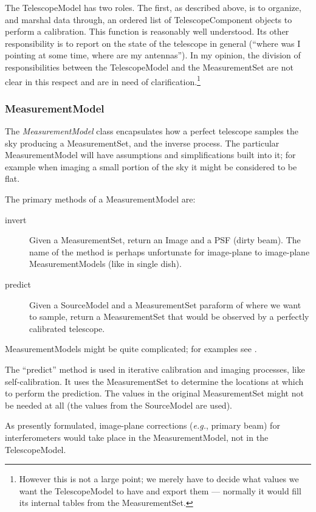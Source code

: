 The TelescopeModel has two roles. The first, as described above, is to
organize, and marshal data through, an ordered list of
TelescopeComponent objects to perform a calibration. This function is
reasonably well understood. Its other responsibility is to report on
the state of the telescope in general (``where was I pointing at some
time, where are my antennas''). In my opinion, the division of
responsibilities between the TelescopeModel and the MeasurementSet are
not clear in this respect and are in need of
clarification.\footnote{However this is not a large point; we merely
have to decide what values we want the TelescopeModel to have and
export them --- normally it would fill its internal tables from the
MeasurementSet.}

\subsubsection{MeasurementModel}

The {\em MeasurementModel} class encapsulates how a perfect telescope
samples the sky producing a MeasurementSet, and the inverse
process. The particular MeasurementModel will have assumptions and
simplifications built into it; for example when imaging a small
portion of the sky it might be considered to be flat.

The primary methods of a MeasurementModel are:
\begin{description}
	\item[invert] Given a MeasurementSet, return an Image and a
	PSF (dirty beam).
        The name of the method is perhaps unfortunate for image-plane to 
	image-plane MeasurementModels (like in single dish).
	\item[predict] Given a SourceModel and a MeasurementSet
        paraform of where we want to sample, return a MeasurementSet
        that would be observed by a perfectly calibrated telescope.
\end{description}

MeasurementModels might be quite complicated; for examples see
\cite{bh:exotic,cornwell:imaging}.

The ``predict'' method is used in iterative calibration and imaging
processes, like self-calibration. It uses the MeasurementSet to
determine the locations at which to perform the prediction. The values
in the original MeasurementSet might not be needed at all (the values
from the SourceModel are used).

As presently formulated, image-plane corrections ({\em e.g.}, primary
beam) for interferometers would take place in the MeasurementModel,
not in the TelescopeModel.


